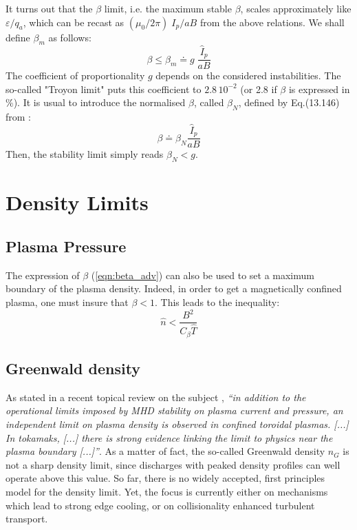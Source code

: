 It turns out that the $\beta$ limit, i.e. the maximum stable $\beta$, scales approximately like $\varepsilon/q_a$, which can be recast as $(\mu_0/2\pi)\; I_p/aB$ from the above relations. We shall define $\beta_m$ as follows:
\begin{equation*}
\beta \leqslant \beta_m \doteq g\; \frac{\hat I_p}{a B}
\end{equation*}
The coefficient of proportionality $g$ depends on the considered instabilities. The so-called "Troyon limit"  puts this coefficient to $2.8\, 10^{-2}$ (or 2.8 if $\beta$ is expressed in $\%$).
It is usual to introduce the normalised $\beta$, called $\beta_N$, defined by Eq.(13.146) from :
\begin{equation}
\beta \doteq \beta_N \frac{\hat I_p}{a B}
\label{eq:betaN_def}
\end{equation}
Then, the stability limit simply reads $\beta_N <g$.

\section{Density Limits}
\subsection{Plasma Pressure}
The expression of $\beta$ (\ref{eqn:beta_adv}) can also be used to set a maximum boundary of the plasma density. Indeed, in order to get a magnetically confined plasma, one must insure that $\beta < 1$. This leads to the inequality:
\begin{equation}
    \hat n < \frac{B^2}{C_\beta \hat T}
\end{equation}


\subsection{Greenwald density}

As stated in a recent topical review on the subject , \emph{``in addition to the operational limits imposed by MHD stability on plasma current and pressure, an independent limit on plasma density is observed in confined toroidal plasmas. [...] In tokamaks, [...] there is strong evidence linking the limit to physics near the plasma boundary [...]''}. As a matter of fact, the so-called Greenwald density $n_G$ is not a sharp density limit, since discharges with peaked density profiles can well operate above this value. So far, there is no widely accepted, first principles model for the density limit. Yet, the focus is currently either on mechanisms which lead to strong edge cooling, or on collisionality enhanced turbulent transport.

